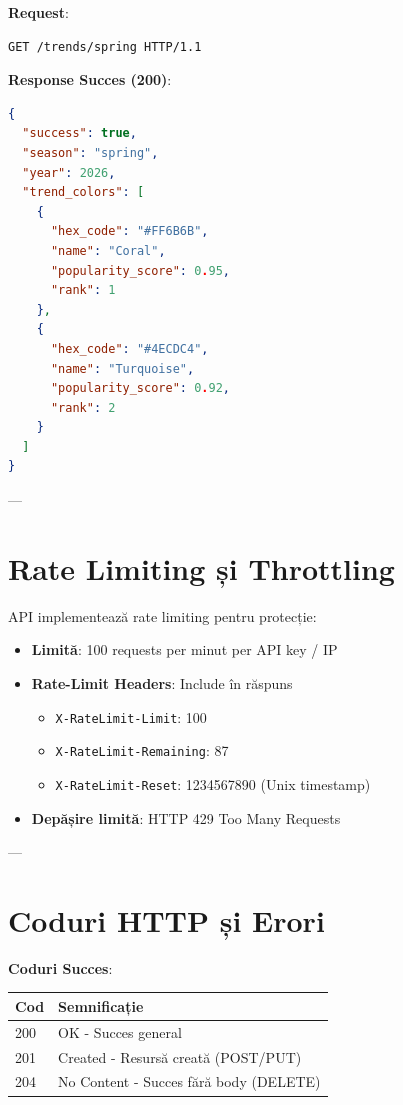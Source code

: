 \textbf{Request}:

\begin{lstlisting}[language=HTTP]
GET /trends/spring HTTP/1.1
\end{lstlisting}

\textbf{Response Succes (200)}:

\begin{lstlisting}[language=JSON]
{
  "success": true,
  "season": "spring",
  "year": 2026,
  "trend_colors": [
    {
      "hex_code": "#FF6B6B",
      "name": "Coral",
      "popularity_score": 0.95,
      "rank": 1
    },
    {
      "hex_code": "#4ECDC4",
      "name": "Turquoise",
      "popularity_score": 0.92,
      "rank": 2
    }
  ]
}
\end{lstlisting}

---

\section{Rate Limiting și Throttling}

API implementează rate limiting pentru protecție:

\begin{itemize}
    \item \textbf{Limită}: 100 requests per minut per API key / IP
    \item \textbf{Rate-Limit Headers}: Include în răspuns
    \begin{itemize}
        \item \texttt{X-RateLimit-Limit}: 100
        \item \texttt{X-RateLimit-Remaining}: 87
        \item \texttt{X-RateLimit-Reset}: 1234567890 (Unix timestamp)
    \end{itemize}
    \item \textbf{Depășire limită}: HTTP 429 Too Many Requests
\end{itemize}

---

\section{Coduri HTTP și Erori}

\textbf{Coduri Succes}:
\begin{table}[h]
    \centering
    \begin{tabular}{|l|l|}
    \hline
    \textbf{Cod} & \textbf{Semnificație} \\ \hline
    200 & OK - Succes general \\ \hline
    201 & Created - Resursă creată (POST/PUT) \\ \hline
    204 & No Content - Succes fără body (DELETE) \\ \hline
    \end{tabular}
\end{table}

